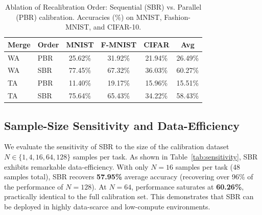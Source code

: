 \documentclass{article}
\theoremstyle{plain}
\theoremstyle{definition}
\theoremstyle{remark}
\begin{document}
\begin{table}[t]
\caption{Ablation of Recalibration Order: Sequential (SBR) vs. Parallel (PBR) calibration. Accuracies (\%) on MNIST, Fashion-MNIST, and CIFAR-10.}
\label{tab:ablation}
\vskip 0.1in
\begin{center}
\begin{footnotesize}
\begin{sc}
\setlength{\tabcolsep}{4.5pt}
\begin{tabular}{llcccc}
\toprule
Merge & Order & MNIST & F-MNIST & CIFAR & Avg \\
\midrule
WA & PBR & 25.62\% & 31.92\% & 21.94\% & 26.49\% \\
WA & SBR & 77.45\% & 67.32\% & 36.03\% & 60.27\% \\
\midrule
TA & PBR & 11.40\% & 19.17\% & 15.96\% & 15.51\% \\
TA & SBR & 75.64\% & 65.43\% & 34.22\% & 58.43\% \\
\bottomrule
\end{tabular}
\end{sc}
\end{footnotesize}
\end{center}
\end{table}

\subsection{Sample-Size Sensitivity and Data-Efficiency}
We evaluate the sensitivity of SBR to the size of the calibration dataset $N \in \{1, 4, 16, 64, 128\}$ samples per task. As shown in Table~\ref{tab:sensitivity}, SBR exhibits remarkable data-efficiency. With only $N = 16$ samples per task (48 samples total), SBR recovers \textbf{57.95\%} average accuracy (recovering over 96\% of the performance of $N = 128$). At $N = 64$, performance saturates at \textbf{60.26\%}, practically identical to the full calibration set. This demonstrates that SBR can be deployed in highly data-scarce and low-compute environments.
\end{document}
